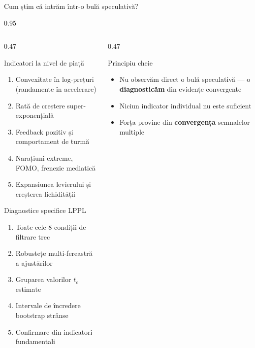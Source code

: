 \documentclass[9pt, aspectratio=169, t]{beamer}
\begin{document}
\begin{frame}{Cum știm că intrăm într-o bulă speculativă?}
    \begin{cminipage}{0.95\textwidth}
    {\footnotesize
    \begin{columns}[T]
        \begin{column}{0.47\textwidth}
            \begin{block}{Indicatori la nivel de piață}
                \begin{enumerate}\setlength{\itemsep}{0pt}
                    \item Convexitate în log-prețuri (randamente în accelerare)
                    \item Rată de creștere super-exponențială
                    \item Feedback pozitiv și comportament de turmă
                    \item Narațiuni extreme, FOMO, frenezie mediatică
                    \item Expansiunea levierului și creșterea lichidității
                \end{enumerate}
            \end{block}

            \begin{exampleblock}{Diagnostice specifice LPPL}
                \begin{enumerate}\setlength{\itemsep}{0pt}
                    \setcounter{enumi}{5}
                    \item Toate cele 8 condiții de filtrare trec
                    \item Robustețe multi-fereastră a ajustărilor
                    \item Gruparea valorilor $t_c$ estimate
                    \item Intervale de încredere bootstrap strânse
                    \item Confirmare din indicatori fundamentali
                \end{enumerate}
            \end{exampleblock}
        \end{column}
        \begin{column}{0.47\textwidth}
            \begin{alertblock}{Principiu cheie}
                \begin{itemize}\setlength{\itemsep}{0pt}
                    \item Nu observăm direct o bulă speculativă --- o \textbf{diagnosticăm} din evidențe convergente
                    \item Niciun indicator individual nu este suficient
                    \item Forța provine din \textbf{convergența} semnalelor multiple
                \end{itemize}
            \end{alertblock}


\end{column}
\end{columns}}
\end{cminipage}
\end{frame}
\end{document}
